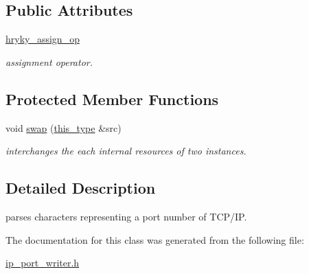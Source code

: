 \subsection*{Public Attributes}
\begin{DoxyCompactItemize}
\item 
\hypertarget{classhryky_1_1ip_1_1port_1_1_writer_a62323eb1ac80a36284b67c8c0abd19d2}{\hyperlink{classhryky_1_1ip_1_1port_1_1_writer_a62323eb1ac80a36284b67c8c0abd19d2}{hryky\-\_\-assign\-\_\-op}}\label{classhryky_1_1ip_1_1port_1_1_writer_a62323eb1ac80a36284b67c8c0abd19d2}

\begin{DoxyCompactList}\small\item\em assignment operator. \end{DoxyCompactList}\end{DoxyCompactItemize}
\subsection*{Protected Member Functions}
\begin{DoxyCompactItemize}
\item 
\hypertarget{classhryky_1_1ip_1_1port_1_1_writer_ad456c9b809d1f4be2a502f1276261d77}{void \hyperlink{classhryky_1_1ip_1_1port_1_1_writer_ad456c9b809d1f4be2a502f1276261d77}{swap} (\hyperlink{classhryky_1_1ip_1_1port_1_1_writer_ab3ca05b8279270920a83e984f5795ea2}{this\-\_\-type} \&src)}\label{classhryky_1_1ip_1_1port_1_1_writer_ad456c9b809d1f4be2a502f1276261d77}

\begin{DoxyCompactList}\small\item\em interchanges the each internal resources of two instances. \end{DoxyCompactList}\end{DoxyCompactItemize}


\subsection{Detailed Description}
parses characters representing a port number of T\-C\-P/\-I\-P. 

The documentation for this class was generated from the following file\-:\begin{DoxyCompactItemize}
\item 
\hyperlink{ip__port__writer_8h}{ip\-\_\-port\-\_\-writer.\-h}\end{DoxyCompactItemize}
